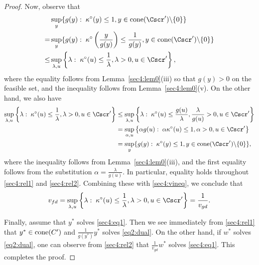 \documentclass{siamltex}   %
\begin{document}
\begin{proof}
    Now, observe that
    \begin{equation}\label{sec4:rel1}
    \begin{split}
     &\sup_y\{g(y):\; \kappa^\circ(y)\le 1, y \in {\rm cone}(\Cscr')\backslash\{0\}\}\\
     = & \sup_y\{g(y):\; \kappa^\circ\left(\frac{y}{g(y)}\right)\le \frac{1}{g(y)}, y \in {\rm cone}(\Cscr')\backslash\{0\}\}\\
     \le & \sup_{\lambda,u} \left\{\lambda:\; \kappa^\circ(u)\le \frac{1}{\lambda} ,\lambda > 0, u\in \Cscr'\right\},
    \end{split}
    \end{equation}
    where the equality follows from Lemma~\ref{sec4:lem0}{\rm (iii)} so that $g(y) > 0$ on the feasible set, and
    the inequality follows from Lemma~\ref{sec4:lem0}{\rm (v)}. On the other hand, we also have
    \begin{equation}\label{sec4:rel2}
    \begin{split}
    \sup_{\lambda,u} \left\{\lambda:\; \kappa^\circ(u)\le \frac{1}{\lambda} ,\lambda > 0, u\in \Cscr'\right\}
    &\le  \sup_{\lambda,u} \left\{\lambda:\; \kappa^\circ(u)\le \frac{g(u)}{\lambda} ,\frac{\lambda}{g(u)} > 0, u\in \Cscr'\right\}\\
    &= \sup_{\alpha,u}\left\{\alpha g(u):\; \alpha \kappa^\circ(u)\le 1, \alpha > 0, u\in \Cscr'\right\}\\
    &= \sup_y\{g(y):\; \kappa^\circ(y)\le 1, y \in {\rm cone}(\Cscr')\backslash\{0\}\},
    \end{split}
    \end{equation}
    where the inequality follows from Lemma~\ref{sec4:lem0}{\rm (iii)}, and the first equality follows from
    the substitution $\alpha = \frac{\lambda}{g(u)}$. In particular, equality holds throughout \eqref{sec4:rel1} and \eqref{sec4:rel2}.
    Combining these with \eqref{sec4:vineq}, we conclude that
    \[
    v_{fd} = \sup_{\lambda,u} \left\{\lambda:\; \kappa^\circ(u)\le \frac{1}{\lambda} ,\lambda > 0, u\in \Cscr'\right\} = \frac{1}{v_{gd}}.
    \]

    Finally, assume that $y^*$ solves \eqref{sec4:eq1}. Then we see immediately from \eqref{sec4:rel1} that $y^*\in {\rm cone}(C')$
    and $\frac{1}{g(y^*)}y^*$ solves \eqref{eq2:dual}. On the other hand, if $w^*$ solves \eqref{eq2:dual}, one can observe from \eqref{sec4:rel2}
    that $\frac{1}{v_{gd}} w^*$ solves \eqref{sec4:eq1}. This completes the proof.



\end{proof}
\end{document}
